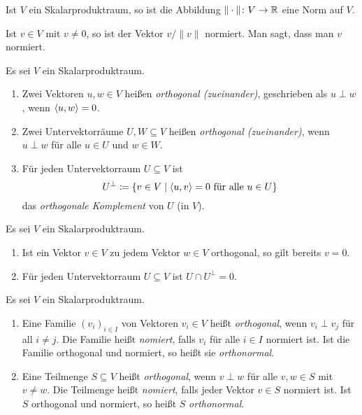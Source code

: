 \begin{corollary}
  Ist $V$ ein Skalarproduktraum, so ist die Abbildung $\|\cdot\| \colon V \to \mathbb{R}$ eine Norm auf $V$.
\end{corollary}


\begin{remark}
  Ist $v \in V$ mit $v \neq 0$, so ist der Vektor $v/\|v\|$ normiert.
  Man sagt, dass man $v$ normiert.
\end{remark}


\begin{definition}
  Es sei $V$ ein Skalarproduktraum.
  \begin{enumerate}[leftmargin=*, label=\roman*)]
    \item
      Zwei Vektoren $u, w \in V$ heißen \emph{orthogonal (zueinander)}, geschrieben als $u \perp w$, wenn $\left\langle u, w \right\rangle = 0$.
    \item
      Zwei Untervektorräume $U, W \subseteq V$ heißen \emph{orthogonal (zueinander)}, wenn $u \perp w$ für alle $u \in U$ und $w \in W$.
    \item
      Für jeden Untervektorraum $U \subseteq V$ ist
      \[
        U^\perp
        \coloneqq
        \{
          v \in V
          \mid
          \text{$\left\langle u, v \right\rangle = 0$ für alle $u \in U$}
        \}
      \]
      das \emph{orthogonale Komplement} von $U$ (in $V$).
  \end{enumerate}
\end{definition}


\begin{lemma}
  Es sei $V$ ein Skalarproduktraum.
  \begin{enumerate}[leftmargin=*, label=\roman*)]
    \item
      Ist ein Vektor $v \in V$ zu jedem Vektor $w \in V$ orthogonal, so gilt bereits $v = 0$.
    \item
      Für jeden Untervektorraum $U \subseteq V$ ist $U \cap U^\perp = 0$.
  \end{enumerate}
\end{lemma}


\begin{definition}
  Es sei $V$ ein Skalarproduktraum.
  \begin{enumerate}[leftmargin=*, label=\roman*)]
    \item
      Eine Familie $(v_i)_{i \in I}$ von Vektoren $v_i \in V$ heißt \emph{orthogonal}, wenn $v_i \perp v_j$ für all $i \neq j$.
      Die Familie heißt \emph{nomiert}, falls $v_i$ für alle $i \in I$ normiert ist.
      Ist die Familie orthogonal und normiert, so heißt sie \emph{orthonormal}.
    \item
      Eine Teilmenge $S \subseteq V$ heißt \emph{orthogonal}, wenn $v \perp w$ für alle $v, w \in S$ mit $v \neq w$.
      Die Teilmenge heißt \emph{nomiert}, falls jeder Vektor $v \in S$ normiert ist.
      Ist $S$ orthogonal und normiert, so heißt $S$ \emph{orthonormal}.
  \end{enumerate}
\end{definition}



